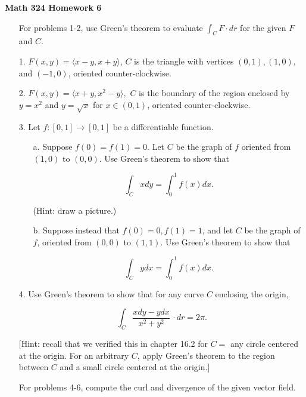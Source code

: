 \documentclass[11 pt]{report}
\begin{document}
\centerline{\bf Math 324 Homework 6}


\vspace{.2cm}

\begin{enumerate} \item[] For problems 1-2, use Green's theorem to evaluate $\int_C F \cdot dr$ for the given $F$ and $C$.

\item[1.] $F(x,y) = \langle x - y, x + y \rangle$, $C$ is the triangle with vertices $(0,1), (1,0),$ and $(-1,0)$, oriented counter-clockwise. 

\item[2.] $F(x,y) = \langle x + y, x^2 - y\rangle,$ $C$ is the boundary of the region enclosed by $y = x^2$ and $y = \sqrt{x}$ for $x \in (0,1)$, oriented counter-clockwise. 

\item[3.] Let $f: [0,1] \to [0,1]$ be a differentiable function. \begin{enumerate} \item[a.] Suppose $f(0) = f(1) = 0$. Let $C$ be the graph of $f$ oriented from $(1,0)$ to $(0,0)$. Use Green's theorem to show that 

$$\int_C x dy = \int_0^1 f(x) dx.$$

(Hint: draw a picture.)

\item[b.] Suppose instead that $f(0) = 0, f(1) = 1$, and let $C$ be the graph of $f$, oriented from $(0,0)$ to $(1,1)$. Use Green's theorem to show that

$$\int_C y dx = \int_0^1 f(x) dx.$$

\end{enumerate}

\item[4.] Use Green's theorem to show that for any curve $C$ enclosing the origin, 

\[
\int_C \frac{x dy - y dx}{x^2 + y^2} \, \cdot dr = 2\pi.
\]

[Hint: recall that we verified this in chapter 16.2 for $C = $ any circle centered at the origin. For an arbitrary $C$, apply Green's theorem to the region between $C$ and a small circle centered at the origin.]

\item[] For problems 4-6, compute the curl and divergence of the given vector field.


\end{enumerate}
\end{document}
